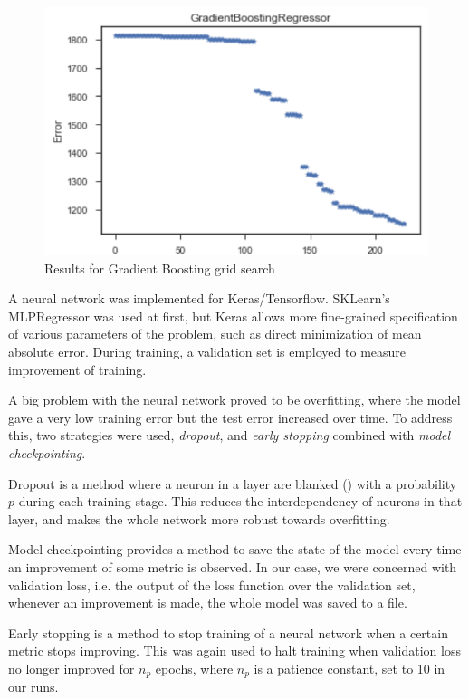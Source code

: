 \documentclass[a4paper]{article}
\begin{document}
\begin{figure}[H]
\centering
\includegraphics{Images/gbr.png}
\caption{Results for Gradient Boosting grid search}
\label{fig:gbr}
\end{figure}

A neural network was implemented for Keras/Tensorflow.  SKLearn's MLPRegressor was used at first, but Keras allows more fine-grained specification of various parameters of the problem, such as direct minimization of mean absolute error.  During training, a validation set is employed to measure improvement of training.

A big problem with the neural network proved to be overfitting, where the model gave a very low training error but the test error increased over time.  
To address this, two strategies were used, \textit{dropout}, and \textit{early stopping } combined with \textit{model checkpointing}. 

Dropout is a method where a neuron in a layer are blanked () with a probability $p$ during each training stage.  This reduces the interdependency of neurons in that layer, and makes the whole network more robust towards overfitting.

Model checkpointing provides a method to save the state of the model every time an improvement of some metric is observed.  In our case, we were concerned with validation loss, i.e. the output of the loss function over the validation set, whenever an improvement is made, the whole model was saved to a file.  

Early stopping is a method to stop training of a neural network when a certain metric stops improving.  This was again used to halt training when validation loss no longer improved for $n_p$ epochs, where $n_p$ is a patience constant, set to 10 in our runs.
\end{document}

